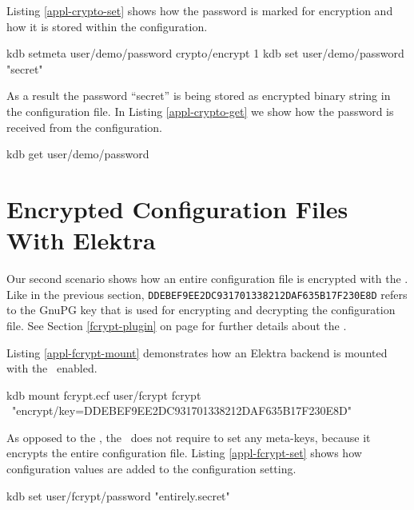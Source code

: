 Listing \ref{appl-crypto-set} shows how the password is marked for encryption and how it is stored within the configuration.

\begin{code}[label=appl-crypto-set,language=bash,caption={Marking a configuration value for encryption}]
kdb setmeta user/demo/password crypto/encrypt 1
kdb set user/demo/password "secret"
\end{code}

As a result the password ``secret'' is being stored as encrypted binary string in the configuration file.
In Listing \ref{appl-crypto-get} we show how the password is received from the configuration.

\begin{code}[label=appl-crypto-get,language=bash,caption={Receiving an encrypted configuration value}]
kdb get user/demo/password
\end{code}


\section{Encrypted Configuration Files With Elektra}

Our second scenario shows how an entire configuration file is encrypted with the \fcrypt{}.
Like in the previous section, \texttt{DDEBEF9EE2DC931701338212DAF635B17F230E8D} refers to the GnuPG key that is used for encrypting and decrypting the configuration file.
See Section \ref{fcrypt-plugin} on page \pageref{fcrypt-plugin} for further details about the \fcrypt{}.

Listing \ref{appl-fcrypt-mount} demonstrates how an Elektra backend is mounted with the \fcrypt ~enabled.

\begin{code}[label=appl-fcrypt-mount,language=bash,caption={Mounting an Elektra backend with the \fcrypt{}}]
kdb mount fcrypt.ecf user/fcrypt fcrypt \
    "encrypt/key=DDEBEF9EE2DC931701338212DAF635B17F230E8D"
\end{code}

As opposed to the \crypto{}, the \fcrypt ~does not require to set any meta-keys, because it encrypts the entire configuration file.
Listing \ref{appl-fcrypt-set} shows how configuration values are added to the configuration setting.

\begin{code}[label=appl-fcrypt-set,language=bash,caption={Adding configuration values with the \fcrypt{}}]
kdb set user/fcrypt/password "entirely.secret"
\end{code}

